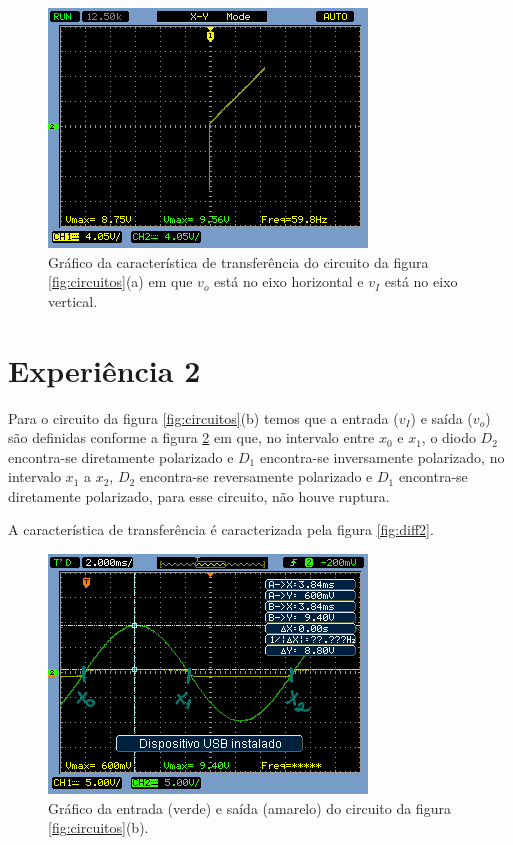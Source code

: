 \documentclass{abntex2}
\begin{document}
\begin{figure}[h]
  \centering
  \includegraphics[scale = 0.7]{diferenca-1a.png}
  \caption{Gráfico da característica de transferência do circuito da figura \ref{fig:circuitos}(a) em que $v_o$ está no eixo horizontal e $v_I$ está no eixo vertical.}
  \label{fig:diff1}
\end{figure}
\pagebreak
\section{Experiência 2}

Para o circuito da figura \ref{fig:circuitos}(b) temos que a entrada ($v_I$) e saída ($v_o$) são definidas conforme a figura \ref{fig:io2}  em que, no intervalo entre $x_0$ e $x_1$, o diodo $D_2$ encontra-se diretamente polarizado e $D_1$ encontra-se inversamente polarizado, no intervalo $x_1$ a $x_2$, $D_2$ encontra-se reversamente polarizado e $D_1$ encontra-se diretamente polarizado, para esse circuito, não houve ruptura.

A característica de transferência é caracterizada pela figura \ref{fig:diff2}.

\begin{figure}[h]
  \centering
  \includegraphics[scale = 0.7]{circuito-1b-esboco2.png}
  \caption{Gráfico da entrada (verde) e saída (amarelo) do circuito da figura \ref{fig:circuitos}(b).}
  \label{fig:io2}
\end{figure}
\end{document}
